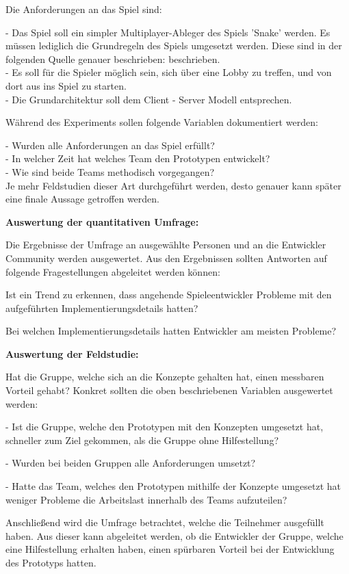 Die Anforderungen an das Spiel sind:

- Das Spiel soll ein simpler Multiplayer-Ableger des Spiels 'Snake' werden. Es müssen lediglich die Grundregeln des Spiels umgesetzt werden. Diese sind in der folgenden Quelle genauer beschrieben: \cite{.22.02.2022} beschrieben. \\
- Es soll für die Spieler möglich sein, sich über eine Lobby zu treffen, und von dort aus ins Spiel zu starten. \\
- Die Grundarchitektur soll dem Client - Server Modell entsprechen.

Während des Experiments sollen folgende Variablen dokumentiert werden:

- Wurden alle Anforderungen an das Spiel erfüllt? \\
- In welcher Zeit hat welches Team den Prototypen entwickelt? \\
- Wie sind beide Teams methodisch vorgegangen? \\

Je mehr Feldstudien dieser Art durchgeführt werden, desto genauer kann später eine finale Aussage getroffen werden.

\textbf{Auswertung der quantitativen Umfrage:}

Die Ergebnisse der Umfrage an ausgewählte Personen und an die Entwickler Community werden ausgewertet. Aus den Ergebnissen sollten Antworten auf folgende Fragestellungen abgeleitet werden können:

Ist ein Trend zu erkennen, dass angehende Spieleentwickler Probleme mit den aufgeführten Implementierungsdetails hatten?

Bei welchen Implementierungsdetails hatten Entwickler am meisten Probleme?

\textbf{Auswertung der Feldstudie:}

Hat die Gruppe, welche sich an die Konzepte gehalten hat, einen messbaren Vorteil gehabt? Konkret sollten die oben beschriebenen Variablen ausgewertet werden:

- Ist die Gruppe, welche den Prototypen mit den Konzepten umgesetzt hat, schneller zum Ziel gekommen, als die Gruppe ohne Hilfestellung?

- Wurden bei beiden Gruppen alle Anforderungen umsetzt?

- Hatte das Team, welches den Prototypen mithilfe der Konzepte umgesetzt hat weniger Probleme die Arbeitslast innerhalb des Teams aufzuteilen?

Anschließend wird die Umfrage betrachtet, welche die Teilnehmer ausgefüllt haben. Aus dieser kann abgeleitet werden, ob die Entwickler der Gruppe, welche eine Hilfestellung erhalten haben, einen spürbaren Vorteil bei der Entwicklung des Prototyps hatten.

